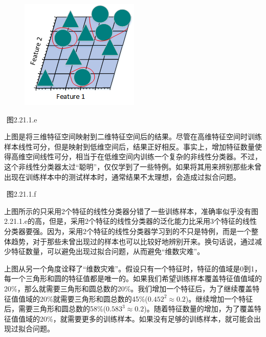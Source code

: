 \begin{figure}
\centering
\includegraphics{./img/ch2/2.21.1.5.png}
 
\end{figure}

​ 图2.21.1.e

​
上图是将三维特征空间映射到二维特征空间后的结果。尽管在高维特征空间时训练样本线性可分，但是映射到低维空间后，结果正好相反。事实上，增加特征数量使得高维空间线性可分，相当于在低维空间内训练一个复杂的非线性分类器。不过，这个非线性分类器太过``聪明''，仅仅学到了一些特例。如果将其用来辨别那些未曾出现在训练样本中的测试样本时，通常结果不太理想，会造成过拟合问题。

 

​ 图2.21.1.f

​
上图所示的只采用2个特征的线性分类器分错了一些训练样本，准确率似乎没有图2.21.1.e的高，但是，采用2个特征的线性分类器的泛化能力比采用3个特征的线性分类器要强。因为，采用2个特征的线性分类器学习到的不只是特例，而是一个整体趋势，对于那些未曾出现过的样本也可以比较好地辨别开来。换句话说，通过减少特征数量，可以避免出现过拟合问题，从而避免``维数灾难''。

 

​
上图从另一个角度诠释了``维数灾难''。假设只有一个特征时，特征的值域是0到1，每一个三角形和圆的特征值都是唯一的。如果我们希望训练样本覆盖特征值值域的20\%，那么就需要三角形和圆总数的20\%。我们增加一个特征后，为了继续覆盖特征值值域的20\%就需要三角形和圆总数的45\%($0.452^2\approx0.2$)。继续增加一个特征后，需要三角形和圆总数的58\%($0.583^3\approx0.2$)。随着特征数量的增加，为了覆盖特征值值域的20\%，就需要更多的训练样本。如果没有足够的训练样本，就可能会出现过拟合问题。

